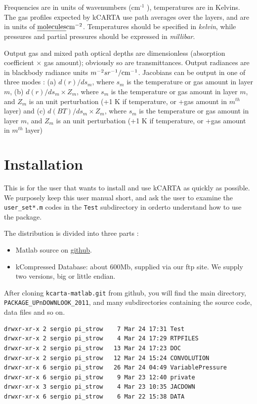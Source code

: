 \documentclass[11pt]{article}
\begin{document}
Frequencies are in units of wavenumbers (cm$^{\text{-1}}$ ), temperatures are in
Kelvins. The gas profiles expected by kCARTA use path averages over the
layers, and are in units of $\hbox{\em molecules} {\hbox{cm}}^{-2}$.
Temperatures should be specified in \emph{kelvin}, while pressures and
partial pressures should be expressed in \emph{millibar}.

Output gas and mixed path optical depths are dimensionless (absorption
coefficient $\times$ gas amount); obviously so are transmittances.
Output radiances are in blackbody radiance units
$m^{-2} sr^{-1}/{\hbox{cm}}^{-1}$. Jacobians can be output in one of
three modes : (a) $d(r)/ds_{m}$, where $s_{m}$ is the temperature or gas
amount in layer $m$, (b) $d(r)/ds_{m} \times Z_{m}$, where $s_{m}$ is
the temperature or gas amount in layer $m$, and $Z_{m}$ is an unit
perturbation (+1 K if temperature, or +gas amount in $m^{th}$ layer) and
(c) $d(BT)/ds_{m} \times Z_{m}$, where $s_{m}$ is the temperature or gas
amount in layer $m$, and $Z_{m}$ is an unit perturbation (+1 K if
temperature, or +gas amount in $m^{th}$ layer)

\section{Installation}
\label{sec-7}

This is for the user that wants to install and use kCARTA as quickly as
possible. We purposely keep this user manual short, and ask the user to
examine the \texttt{user\_set*.m} codes in the \texttt{Test} subdirectory in orderto
understand how to use the package.

The distribution is divided into three parts :

\begin{itemize}
\item Matlab source on \href{http://github.com/strow/kcarta-matlab}{github}.

\item kCompressed Database: about 600Mb, supplied via our ftp site. We
supply two versions, big or little endian.
\end{itemize}

After cloning \texttt{kcarta-matlab.git} from github, you will find the main
directory, \texttt{PACKAGE\_UPnDOWNLOOK\_2011}, and many subdirectories
containing the source code, data files and so on.

\begin{verbatim}
drwxr-xr-x 2 sergio pi_strow    7 Mar 24 17:31 Test
drwxr-xr-x 2 sergio pi_strow    4 Mar 24 17:29 RTPFILES
drwxr-xr-x 2 sergio pi_strow   13 Mar 24 17:23 DOC
drwxr-xr-x 2 sergio pi_strow   12 Mar 24 15:24 CONVOLUTION
drwxr-xr-x 6 sergio pi_strow   26 Mar 24 04:49 VariablePressure
drwxr-xr-x 6 sergio pi_strow    9 Mar 23 12:40 private
drwxr-xr-x 3 sergio pi_strow    4 Mar 23 10:35 JACDOWN
drwxr-xr-x 6 sergio pi_strow    6 Mar 22 15:38 DATA
\end{verbatim}
\end{document}
